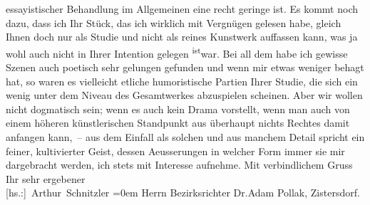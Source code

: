 \begin{ledgroupsized}[t]{13cm}
               essayistischer Behandlung im Allgemeinen eine recht geringe ist. Es kommt noch dazu,
               dass ich Ihr Stück, das ich
               wirklich mit Vergnügen gelesen habe, gleich Ihnen doch nur als Studie und nicht als
               reines Kunstwerk auffassen kann, was ja wohl auch nicht in Ihrer Intention gelegen \substVorne{}\textsuperscript{ist}\substDazwischen{}war\substHinten{}. Bei all dem habe ich gewisse Szenen auch poetisch sehr gelungen gefunden
               und wenn mir etwas weniger behagt hat, so waren es vielleicht etliche humoristische
               Partien Ihrer Studie, die sich ein wenig unter dem Niveau des Gesamtwerkes abzuspielen scheinen. Aber wir
               wollen nicht dogmatisch sein; wenn {\pb}es auch kein Drama  vorstellt, wenn man auch von einem höheren
               künstlerischen Standpunkt aus überhaupt nichts Rechtes damit anfangen kann, – aus dem
               Einfall als solchen und aus manchem Detail spricht ein feiner, kultivierter Geist,
               dessen Aeusserungen in welcher Form immer sie mir dargebracht werden, ich \introOben{}stets\introOben{} mit Interesse aufnehme.\pend
           \pstart
           Mit verbindlichem Gruss{\\[\baselineskip]}Ihr sehr ergebener{\\[\baselineskip]}\spacefill\mbox{{[}hs.:{]} Arthur Schnitzler}\pend
           \leftskip=0em{}\pstart
           \noindent{}Herrn Bezirksrichter Dr.Adam Pollak, Zistersdorf.\pend
           
         
         \endnumbering{}\end{ledgroupsized}  \newcommand{\dateiname}{L02137}\newcommand{\titel}{Arthur Schnitzler an Robert Adam, 13. 5. 1913}\newcommand{\editorInnen}{Martin Anton Müller und Gerd-Hermann Susen}
      
